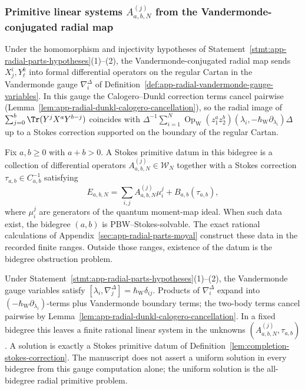 \subsubsection{\texorpdfstring{Primitive linear systems \(A^{(j)}_{a,b,N}\) from the Vandermonde-conjugated radial map}{Primitive linear systems A-j-a,b,N from the Vandermonde-conjugated radial map}}
\label{ssec:completion-decorated-pbw-stokes-primitives}

Under the homomorphism and injectivity hypotheses of
Statement~\ref{stmt:app-radial-parts-hypotheses}(1)--(2), the
Vandermonde-conjugated radial map sends \(X^i_j,Y^k_\ell\) into
formal differential operators on the regular Cartan in the
Vandermonde gauge \(\nabla^\Delta_i\) of
Definition~\ref{def:app-radial-vandermonde-gauge-variables}.  In this
gauge the Calogero--Dunkl correction terms cancel pairwise
(Lemma~\ref{lem:app-radial-dunkl-calogero-cancellation}), so the
radial image of \(\sum_{j=0}^b\Tr(Y^jX^aY^{b-j})\) coincides with
\(\Delta^{-1}\sum_{i=1}^N\operatorname{Op}_{\mathrm W}(z_1^az_2^b)
(\lambda_i,-\hbar_{\mathrm{W}}\partial_{\lambda_i})\Delta\) up to a Stokes
correction supported on the boundary of the regular Cartan.

\begin{defn}
\label{lem:completion-stokes-correction}
Fix \(a,b\ge 0\) with \(a+b>0\).  A Stokes primitive datum in this
bidegree is a collection of differential operators
\(A^{(j)}_{a,b,N}\in\mathcal W_N\) together with a Stokes correction
\(\tau_{a,b}\in C^{-1}_{a,b}\) satisfying
\[
  E_{a,b,N}=\sum_{i,j}A^{(j)}_{a,b,N}\mu^j_i+B_{a,b}(\tau_{a,b}),
\]
where \(\mu^j_i\) are generators of the quantum moment-map ideal.
When such data exist, the bidegree \((a,b)\) is
PBW--Stokes-solvable.  The exact rational calculations of
Appendix~\ref{sec:app-radial-parts-moyal} construct these data in the
recorded finite ranges.  Outside those ranges, existence of the datum is
the bidegree obstruction problem.
\end{defn}

\begin{rmk}
Under Statement~\ref{stmt:app-radial-parts-hypotheses}(1)--(2), the
Vandermonde gauge variables satisfy
\([\lambda_i,\nabla^\Delta_j]=\hbar_{\mathrm{W}}\delta_{ij}\).  Products of
\(\nabla^\Delta_i\) expand into \((-\hbar_{\mathrm{W}}\partial_{\lambda_i})\)-terms
plus Vandermonde boundary terms; the two-body terms cancel pairwise by
Lemma~\ref{lem:app-radial-dunkl-calogero-cancellation}.  In a fixed
bidegree this leaves a finite rational linear system in the unknowns
\((A^{(j)}_{a,b,N},\tau_{a,b})\).  A solution is exactly a Stokes
primitive datum of Definition~\ref{lem:completion-stokes-correction}.
The manuscript does not assert a uniform solution in every bidegree
from this gauge computation alone; the uniform solution is the
all-bidegree radial primitive problem.
\end{rmk}

